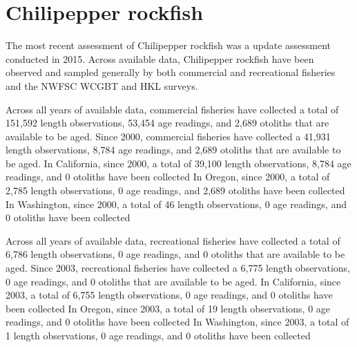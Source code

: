 \documentclass[11pt,
  english,
  letterpaper,
]{article}
\begin{document}

\hypertarget{chilipepper-rockfish}{%
\section{Chilipepper rockfish}\label{chilipepper-rockfish}}

\leavevmode\tagmcend\tagstructend


The most recent assessment of Chilipepper rockfish was a update assessment conducted in 2015. Across available data, Chilipepper rockfish have been observed and sampled generally by both commercial and recreational fisheries and the NWFSC WCGBT and HKL surveys.

\leavevmode\tagmcend\tagstructend\par


Across all years of available data, commercial fisheries have collected a total of 151,592 length observations, 53,454 age readings, and 2,689 otoliths that are available to be aged. Since 2000, commercial fisheries have collected a 41,931 length observations, 8,784 age readings, and 2,689 otoliths that are available to be aged. In California, since 2000, a total of 39,100 length observations, 8,784 age readings, and 0 otoliths have been collected In Oregon, since 2000, a total of 2,785 length observations, 0 age readings, and 2,689 otoliths have been collected In Washington, since 2000, a total of 46 length observations, 0 age readings, and 0 otoliths have been collected

\leavevmode\tagmcend\tagstructend\par


Across all years of available data, recreational fisheries have collected a total of 6,786 length observations, 0 age readings, and 0 otoliths that are available to be aged. Since 2003, recreational fisheries have collected a 6,775 length observations, 0 age readings, and 0 otoliths that are available to be aged. In California, since 2003, a total of 6,755 length observations, 0 age readings, and 0 otoliths have been collected In Oregon, since 2003, a total of 19 length observations, 0 age readings, and 0 otoliths have been collected In Washington, since 2003, a total of 1 length observations, 0 age readings, and 0 otoliths have been collected
\end{document}
